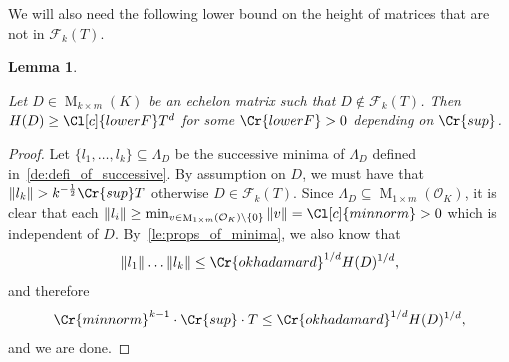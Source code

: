 \documentclass{amsart}
\newtheorem{lemma}[theorem]{Lemma}
\theoremstyle{definition}
\theoremstyle{remark}
\newcommand{\OK}{\mathcal{O}_K}
\DeclareMathOperator{\M}{M}
\begin{document}
We will also need the following lower bound on the height of matrices that are not in $\mathcal{F}_{k}(T)$.
\begin{lemma}
    \label{le:lower_bound_not_in_F}

    Let $D \in \M_{k \times m}(K)$ be an echelon matrix such that $D \notin \mathcal{F}_{k}(T)$.
    Then $H(D) \geq \Cl[c]{lowerF}T^{d}$ for some $\Cr{lowerF} > 0$ depending on $\Cr{sup}$.
\end{lemma}
\begin{proof}
    Let 
    $\{l_{1},\dots,l_{k}\} \subseteq \Lambda_{D}$ 
    be the successive minima of $\Lambda_{D}$ defined in~\cref{de:defi_of_successive}.
    By assumption on $D$, we must have that $\|l_{k}\| > k^{-\frac{1}{2}} \Cr{sup} T$ otherwise $D \in \mathcal{F}_{k}(T)$.
    Since $\Lambda_{D} \subseteq \M_{1 \times m}(\OK)$, it is clear that each 
    $\|l_{i}\| \geq  \min_{v \in \M_{1 \times m}(\OK) \setminus \{0\}} \|v\| = \Cl[c]{minnorm}>0$ which is independent of $D$.
    By~\cref{le:props_of_minima}, we also know that 
    \begin{equation}
        \|l_{1}\| \dots \|l_{k}\| \leq \Cr{okhadamard}^{1/d} H(D)^{1/d},
        \label{eq:also_useful}
    \end{equation}
    and therefore 
    \begin{equation}
        \Cr{minnorm}^{k-1} \cdot \Cr{sup} \cdot T \leq \Cr{okhadamard}^{1/d}H(D)^{1/d},
    \end{equation}
    and we are done.
\end{proof}
\end{document}
